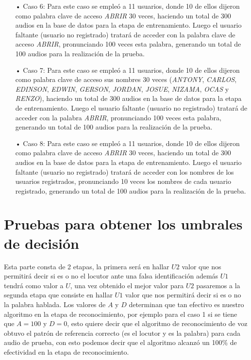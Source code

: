 \begin{enumerate}
\item[•]Caso 6: Para este caso se empleó a 11 usuarios, donde 10 de ellos dijeron como palabra clave de acceso \textit{ABRIR} 30 veces, haciendo un total de 300 audios en la base de datos para la etapa de entrenamiento. Luego el usuario faltante (usuario no registrado) tratará de acceder con la palabra clave de acceso \textit{ABRIR}, pronunciando 100 veces esta palabra, generando un total de 100 audios para la realización de la prueba.
\item[•]Caso 7: Para este caso se empleó a 11 usuarios, donde 10 de ellos dijeron como palabra clave de acceso sus nombres 30 veces (\textit{ANTONY}, \textit{CARLOS}, \textit{EDINSON}, \textit{EDWIN}, \textit{GERSON}, \textit{JORDAN}, \textit{JOSUE}, \textit{NIZAMA}, \textit{OCAS} y\textit{ RENZO}), haciendo un total de 300 audios en la base de datos para la etapa de entrenamiento. Luego el usuario faltante (usuario no registrado) tratará de acceder con la palabra \textit{ABRIR}, pronunciando 100 veces esta palabra, generando un total de 100 audios para la realización de la prueba.
\item[•]Caso 8: Para este caso se empleó a 11 usuarios, donde 10 de ellos dijeron como palabra clave de acceso \textit{ABRIR} 30 veces, haciendo un total de 300 audios en la base de datos para la etapa de entrenamiento. Luego el usuario faltante (usuario no registrado) tratará de acceder con los nombres de los usuarios registrados, pronunciando 10 veces los nombres de cada usuario registrado, generando un total de 100 audios para la realización de la prueba.
\end{enumerate}

\section{Pruebas para obtener los umbrales de decisión}
Esta parte consta de 2 etapas, la primera será en hallar $U2$ valor que nos permitirá decir si es o no el locutor ante una falsa identificación además $U1$ tendrá como valor a $U$, una vez obtenido el mejor valor para $U2$ pasaremos a la segunda etapa que consiste en hallar $U1$ valor que nos permitirá decir si es o no la palabra hablada.
\vskip 0.5cm
Los valores de $A$ y $D$ determinan que tan efectivo es nuestro algoritmo en la etapa de reconocimiento, por ejemplo para el caso 1 si se tiene que $A = 100$ y $D = 0$, esto quiere decir que el algoritmo de reconocimiento de voz obtuvo el patrón de referencia correcto (es el locutor y es la palabra) para cada audio de prueba, con esto podemos decir que el algoritmo alcanzó un 100\% de efectividad en la etapa de reconocimiento.

